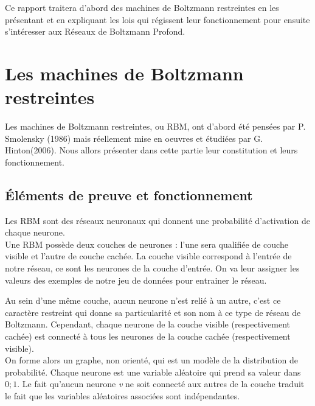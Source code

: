 \documentclass[a4paper,oneside]{report}
\begin{document}
            Ce rapport traitera d'abord des machines de Boltzmann restreintes en les
            présentant et en expliquant les lois qui régissent leur fonctionnement pour
            ensuite s'intéresser aux Réseaux de Boltzmann Profond.

        \chapter{Les machines de Boltzmann restreintes}

            Les machines de Boltzmann restreintes, ou RBM, ont d'abord été
            pensées par P. Smolensky (1986) mais réellement mise en oeuvres et
            étudiées par G.
            Hinton(2006). Nous allors présenter dans cette partie leur constitution et
            leurs fonctionnement.

            \section{Éléments de preuve et fonctionnement}

                Les RBM sont des réseaux neuronaux qui donnent une
                probabilité d'activation de chaque neurone.\\

                Une RBM possède deux couches de neurones : l'une sera qualifiée 
                de couche visible et l'autre de couche cachée.
                La couche visible correspond à l'entrée de notre réseau, ce sont
                les neurones de la couche d'entrée. On va leur assigner les
                valeurs des exemples de notre jeu de données pour entrainer le
                réseau.

                Au sein d'une même couche, aucun neurone n'est relié à un
                autre, c'est ce caractère restreint qui donne sa particularité 
                et son nom à ce type de réseau de Boltzmann.
                Cependant, chaque neurone de la couche visible (respectivement
                cachée) est connecté à tous les neurones de la couche cachée 
                (respectivement visible).\\
                
                On forme alors un graphe, non orienté, qui est un
                modèle de la distribution de probabilité. Chaque neurone est une variable aléatoire
                qui prend sa valeur dans \begin{math}{0;1}\end{math}. Le fait
                qu'aucun neurone \textit{v} ne soit connecté aux autres de la
                couche traduit le fait que les variables aléatoires associées
                sont indépendantes.
                
\end{document}
